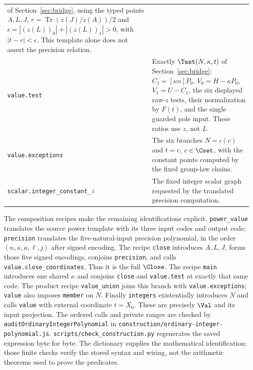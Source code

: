 \begin{longtable}{p{}p{}}
of Section~\ref{sec:bridge}, using the typed points $A,L,J$,
$r=\operatorname{Tr}(z(J)/z(A))/2$ and
$\epsilon=|(z(L))_0|+|(z(L))_1|>0$, with $|t-r|<\epsilon$.
This template alone does not assert the precision relation.\\
\nolinkurl{value.test} & Exactly $\Test(N,\kappa,t)$ of
Section~\ref{sec:bridge}: $C_1=[\kappa n]P_0$,
$V_0=H-\kappa P_0$, $V_1=U-C_1$, the six displayed raw-$z$ tests,
their normalization by $F(t)$, and the single guarded pole input.
These ratios use $z$, not $L$.\\
\nolinkurl{value.exceptions} & The six branches
$N=\iota(c)$ and $t=c$, $c\in\Cset$, with the constant points
computed by the fixed group-law chains.\\
\nolinkurl{scalar.integer_constant_}\,$i$ & The fixed integer
scalar graph requested by the translated precision computation.\\
\bottomrule
\end{longtable}

The composition recipes make the remaining identifications explicit.
\texttt{power\_value} translates the source power template with its
three input codes and output code; \texttt{precision} translates
the five-natural-input precision polynomial, in the order
$(n,\kappa,a,\ell,j)$ after signed encoding. The recipe
\texttt{close} introduces $A,L,J$, forms those five signed encodings,
conjoins \texttt{precision}, and calls
\nolinkurl{value.close_coordinates}. Thus it is the full $\Close$.
The recipe \texttt{main} introduces one shared $\kappa$ and conjoins
\texttt{close} and \nolinkurl{value.test} at exactly that same code.
The product recipe \texttt{value\_union} joins this branch with
\nolinkurl{value.exceptions}; \texttt{value} also imposes
\texttt{member} on $N$. Finally \texttt{integers} existentially
introduces $N$ and calls \texttt{value} with external coordinate
$t=X_0$. These are precisely $\Val$ and its input projection.
The ordered calls and private ranges are checked by
\nolinkurl{auditOrdinaryIntegerPolynomial} in
\nolinkurl{construction/ordinary-integer-polynomial.js}.
\nolinkurl{scripts/check_construction.py} regenerates the saved
expression byte for byte. The dictionary supplies the mathematical
identification; those finite checks verify the stored syntax and
wiring, not the arithmetic theorems used to prove the predicates.


